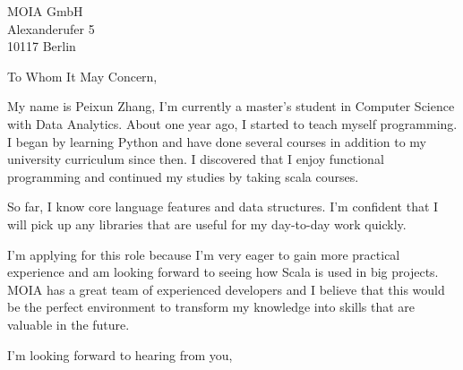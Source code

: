 \documentclass[sender,
               paper=a4,
               version=last,
               fontsize=12pt,
               DIV=13,
               parskip=full]{scrlttr2}
\begin{document}
\begin{letter}{
  MOIA GmbH\\
  Alexanderufer 5\\
  10117 Berlin
}
\opening{To Whom It May Concern,}
\frenchspacing

My name is Peixun Zhang, I'm currently a master's student in Computer Science with Data Analytics.
About one year ago, I started to teach myself programming.
I began by learning Python and have done several courses in addition to my
university curriculum since then. I discovered that I enjoy functional programming
and continued my studies by taking scala courses.

So far, I know core language features and data structures.
I'm confident that I will pick up any libraries that are useful for my day-to-day work quickly.

I'm applying for this role because I'm very eager to gain more practical experience and am looking
forward to seeing how Scala is used in big projects. MOIA has a great team of experienced developers
and I believe that this would be the perfect environment to transform my
knowledge into skills that are valuable in the future.

\closing{I'm looking forward to hearing from you,}
\end{letter}
\end{document}
